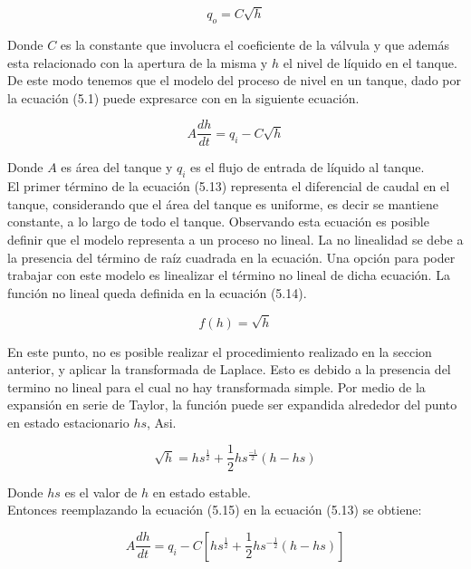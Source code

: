 \documentclass[a4paper,12pt,twoside]{proyectotanquesecci}
\begin{document}
\begin{equation}
q_{o}=C\sqrt{h}
\end{equation}

Donde $C$ es la constante que involucra el coeficiente de la válvula y que además esta relacionado con la apertura de la misma y $h$ el nivel de líquido en el tanque. \\

De este modo tenemos que el modelo del proceso de nivel en un tanque, dado por la ecuación (5.1) puede expresarce con en la siguiente ecuación.

\begin{equation}
A\frac{dh}{dt}=q_{i}-C\sqrt{h}
\end{equation}

Donde $A$ es área del tanque y $q_{i}$ es el flujo de entrada de líquido al tanque. \\

El primer término de la ecuación (5.13) representa el diferencial de caudal en el tanque, considerando que el área del tanque es uniforme, es decir se mantiene constante, a lo largo de todo el tanque. Observando esta ecuación es posible definir que el modelo representa a un proceso no lineal. La no linealidad se debe a la presencia del término de raíz cuadrada en la ecuación. Una opción para poder trabajar con este modelo es linealizar el término no lineal de dicha ecuación. La función no lineal queda definida en la ecuación (5.14).

\begin{equation}
f(h)=\sqrt{h}
\end{equation}

En este punto, no es posible realizar el procedimiento realizado en la seccion anterior, y aplicar la transformada de Laplace. Esto es debido a la presencia del termino no lineal para el cual no hay transformada simple. Por medio de la expansión en serie de Taylor, la función puede ser expandida alrededor del punto en estado estacionario $hs$, Asi.

\begin{equation}
\sqrt{h}=hs^{\frac{1}{2}}+\frac{1}{2}hs^{\frac{-1}{2}}(h-hs)
\end{equation}

Donde $hs$ es el valor de $h$ en estado estable. \\

Entonces reemplazando la ecuación (5.15) en la ecuación (5.13) se obtiene:

\begin{equation}
A\frac{dh}{dt}=q_{i}-C\left[hs^{\frac{1}{2}}+\frac{1}{2} hs^{-\frac{1}{2}}\left(h-hs\right) \right]
\end{equation}
\end{document}
